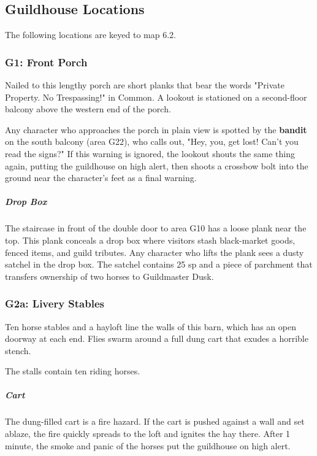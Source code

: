 \documentclass[10pt,a4paper,twoside,bg=print,twocolumn,openany,nodeprecatedcode]{dndbook}
\begin{document}
\subsection{Guildhouse Locations}
The following locations are keyed to map 6.2.

\subsubsection{G1: Front Porch}
\begin{DndReadAloud}{}
Nailed to this lengthy porch are short planks that bear the words "Private Property. No Trespassing!" in Common. A lookout is stationed on a second-floor balcony above the western end of the porch.

\end{DndReadAloud}

Any character who approaches the porch in plain view is spotted by the \textbf{bandit} on the south balcony (area G22), who calls out, "Hey, you, get lost! Can't you read the signs?" If this warning is ignored, the lookout shouts the same thing again, putting the guildhouse on high alert, then shoots a crossbow bolt into the ground near the character's feet as a final warning.

\subparagraph{Drop Box}
The staircase in front of the double door to area G10 has a loose plank near the top. This plank conceals a drop box where visitors stash black-market goods, fenced items, and guild tributes. Any character who lifts the plank sees a dusty satchel in the drop box. The satchel contains 25 sp and a piece of parchment that transfers ownership of two horses to Guildmaster Dusk.

\subsubsection{G2a: Livery Stables}
\begin{DndReadAloud}{}
Ten horse stables and a hayloft line the walls of this barn, which has an open doorway at each end. Flies swarm around a full dung cart that exudes a horrible stench.

\end{DndReadAloud}

The stalls contain ten riding horses.

\subparagraph{Cart}
The dung-filled cart is a fire hazard. If the cart is pushed against a wall and set ablaze, the fire quickly spreads to the loft and ignites the hay there. After 1 minute, the smoke and panic of the horses put the guildhouse on high alert.
\end{document}
